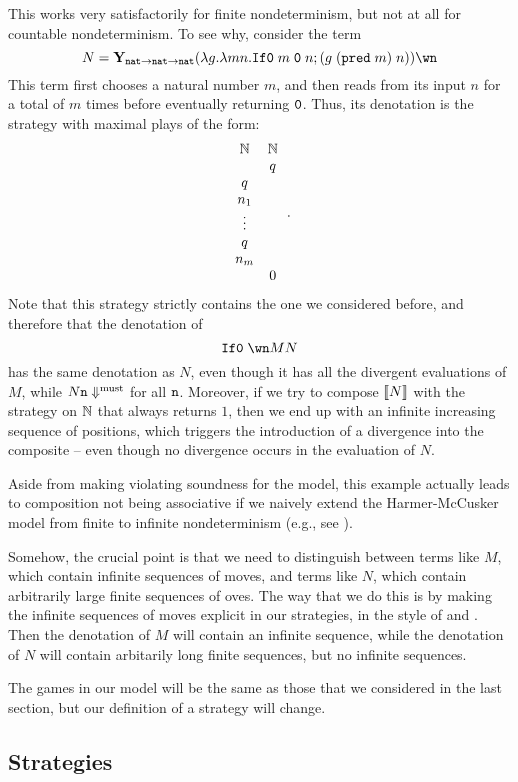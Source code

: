 \documentclass[sigplan,10pt,review]{acmart}\settopmatter{printfolios=true,printccs=false,printacmref=false}
\begin{document}
This works very satisfactorily for finite nondeterminism, but not at all for countable nondeterminism.  
To see why, consider the term
\[
  N = \Y_{\nat\to\nat\to\nat}(\lambda g.\lambda m n.\IfO m\;\0\;n;(g\;(\pred m)\;n))\wn
  \]
This term first chooses a natural number $m$, and then reads from its input $n$ for a total of $m$ times before eventually returning ${\mathtt{0}}$.  
Thus, its denotation is the strategy with maximal plays of the form:
\[
  \begin{array}{cc}
    \mathbf{\mathbb{N}} & \mathbf{\mathbb{N}} \\
    & q \\
    q & \\
    n_1 & \\
    \vdots & \\
    q & \\
    n_m & \\
    & 0
  \end{array}\,.
  \]
Note that this strategy strictly contains the one we considered before, and therefore that the denotation of
\[
  \IfO \wn M N
  \]
has the same denotation as $N$, even though it has all the divergent evaluations of $M$, while $N{\mathtt{n}}\Downarrow^{\text{must}}$ for all ${\mathtt{n}}$.
Moreover, if we try to compose $\left\llbracket N\right\rrbracket$ with the strategy on $\mathbb{N}$ that always returns $1$, then we end up with an infinite increasing sequence of positions, which triggers the introduction of a divergence into the composite -- even though no divergence occurs in the evaluation of $N$.

Aside from making violating soundness for the model, this example actually leads to composition not being associative if we naively extend the Harmer-McCusker model from finite to infinite nondeterminism (e.g., see \cite[4.4.1]{RusssThesis}).  

Somehow, the crucial point is that we need to distinguish between terms like $M$, which contain infinite sequences of moves, and terms like $N$, which contain arbitrarily large finite sequences of oves.  
The way that we do this is by making the infinite sequences of moves explicit in our strategies, in the style of \cite{RoscoeCspInfinite} and \cite{LevyGsInfinite}.  
Then the denotation of $M$ will contain an infinite sequence, while the denotation of $N$ will contain arbitarily long finite sequences, but no infinite sequences.  

The games in our model will be the same as those that we considered in the last section, but our definition of a strategy will change.

\subsection{Strategies}
\end{document}
